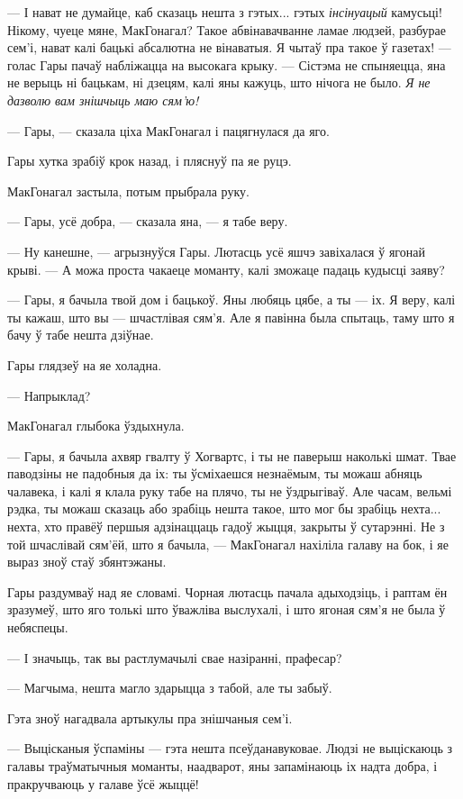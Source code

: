 --- І нават не думайце, каб сказаць нешта з гэтых... гэтых \emph{інсінуацый}
камусьці! Нікому, чуеце мяне, МакГонагал? Такое абвінавачванне ламае людзей,
разбурае сем'і, нават калі бацькі абсалютна не вінаватыя. Я чытаў пра такое 
ў газетах! --- голас Гары пачаў набліжацца на высокага крыку. --- Сістэма не
спыняецца, яна не верыць ні бацькам, ні дзецям, калі яны кажуць, што нічога не
было. \emph{Я не дазволю вам знішчыць маю сям'ю!}

--- Гары, --- сказала ціха МакГонагал і пацягнулася да яго.

Гары хутка зрабіў крок назад, і пляснуў па яе руцэ. 

МакГонагал застыла, потым прыбрала руку.

--- Гары, усё добра, --- сказала яна, --- я табе веру.

--- Ну канешне, --- агрызнуўся Гары. Лютасць усё яшчэ завіхалася ў ягонай крыві.
--- А можа проста чакаеце моманту, калі зможаце падаць кудысці заяву?

--- Гары, я бачыла твой дом і бацькоў. Яны любяць цябе, а ты --- іх. 
Я веру, калі ты кажаш, што вы --- шчастлівая сям'я. Але я павінна была спытаць,
таму што я бачу ў табе нешта дзіўнае.

Гары глядзеў на яе холадна.

--- Напрыклад?

МакГонагал глыбока ўздыхнула.

--- Гары, я бачыла ахвяр гвалту ў Хогвартс, і ты не паверыш наколькі шмат.
Твае паводзіны не падобныя да іх: ты ўсміхаешся незнаёмым, ты можаш абняць
чалавека, і калі я клала руку табе на плячо, ты не ўздрыгіваў. Але часам, вельмі
рэдка, ты можаш сказаць або зрабіць нешта такое, што мог бы зрабіць нехта... 
нехта, хто правёў першыя адзінаццаць гадоў жыцця, закрыты ў сутарэнні.
Не з той шчаслівай сям'ёй, што я бачыла, --- МакГонагал нахіліла галаву 
на бок, і яе выраз зноў стаў збянтэжаны. 

Гары раздумваў над яе словамі. Чорная лютасць пачала адыходзіць, і раптам
ён зразумеў, што яго толькі што ўважліва выслухалі, і што ягоная сям'я не была 
ў небяспецы.

--- І значыць, так вы растлумачылі свае назіранні, прафесар?

--- Магчыма, нешта магло здарыцца з табой, але ты забыў.

Гэта зноў нагадвала артыкулы пра знішчаныя сем'і. 

--- Выцісканыя ўспаміны --- гэта нешта псеўданавуковае. Людзі не выціскаюць з 
галавы траўматычныя моманты, наадварот, яны запамінаюць іх надта добра,
і пракручваюць у галаве ўсё жыццё!

